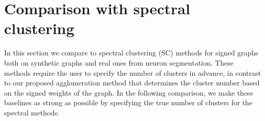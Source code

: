 






\section{Comparison with spectral clustering} \label{sec:spectral_clust}
In this section we compare \algname{} to spectral clustering (SC) methods for signed graphs both on synthetic graphs and real ones from neuron segmentation. These methods require the user to specify the number of clusters in advance, in contrast to our proposed agglomeration method that determines the cluster number based on the signed weights of the graph. In the following comparison, we make these baselines as strong as possible by specifying the true number of clusters for the spectral methods.

